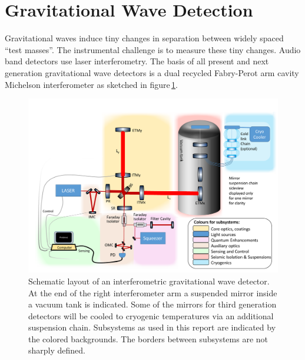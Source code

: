 \section{Gravitational Wave Detection}
Gravitational waves induce tiny changes in separation between widely spaced “test masses”. The instrumental challenge is to measure these tiny changes. Audio band detectors use laser interferometry. The basis of all present and next generation gravitational wave detectors is a dual recycled Fabry-Perot arm cavity Michelson interferometer as sketched in figure\,\ref{fig:ifo_layout}. 
\begin{figure}[ht]
\includegraphics*[width=\textwidth]{Figures/InterferometerSchematicSubsystemColour.pdf}
\caption{Schematic layout of an interferometric gravitational wave detector. At the end of the right interferometer arm a suspended mirror inside a vacuum tank is indicated. Some of the mirrors for third generation detectors will be cooled to cryogenic temperatures via an additional suspension chain. Subsystems as used in this report are indicated by the colored backgrounds. The borders between subsystems are not sharply defined.}
\label{fig:ifo_layout}
\end{figure}

